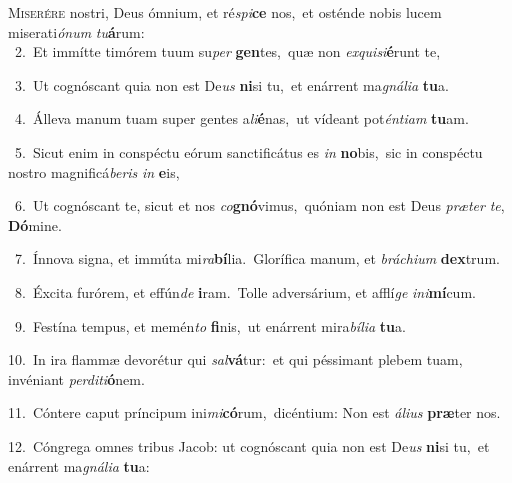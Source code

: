 \lettrine{\initial\textcolor{\initialcolor}{M}}{iserére} nostri, Deus ómnium, et ré\-\textit{spi}\-\textbf{ce} nos,~\star et osténde nobis lucem miserati\-\textit{ó}\-\textit{num} \textit{tu}\-\textbf{á}rum:\\
{\numbfont\textcolor{\numbcolor}{~2.}}~Et immítte timórem tuum su\textit{per} \textbf{gen}\-tes,~\star quæ non \textit{ex}\-\textit{qui}\textit{si}\textbf{é}runt te,\par
{\numbfont\textcolor{\numbcolor}{~3.}}~Ut cognóscant quia non est De\textit{us} \textbf{ni}\-si tu,~\star et enárrent ma\-\textit{gná}\-\textit{li}\textit{a} \textbf{tu}\-a.\par
{\numbfont\textcolor{\numbcolor}{~4.}}~Álleva manum tuam super gentes a\-\textit{li}\-\textbf{é}nas,~\star ut vídeant pot\-\textit{én}\-\textit{ti}\textit{am} \textbf{tu}\-am.\par
{\numbfont\textcolor{\numbcolor}{~5.}}~Sicut enim in conspéctu eórum sanctificátus es \textit{in} \textbf{no}\-bis,~\star sic in conspéctu nostro magnificá\-\textit{be}\-\textit{ris} \textit{in} \textbf{e}\-is,\par
{\numbfont\textcolor{\numbcolor}{~6.}}~Ut cognóscant te, sicut et nos \textit{co}\-\textbf{gnó}vimus,~\star quóniam non est Deus \textit{præ}\-\textit{ter} \textit{te}\-, \textbf{Dó}\-mine.\par
{\numbfont\textcolor{\numbcolor}{~7.}}~Ínnova signa, et immúta mi\-\textit{ra}\-\textbf{bí}lia.~\star Glorífica manum, et \textit{brá}\-\textit{chi}\textit{um} \textbf{dex}\-trum.\par
{\numbfont\textcolor{\numbcolor}{~8.}}~Éxcita furórem, et effún\textit{de} \textbf{i}\-ram.~\star Tolle adversárium, et afflí\textit{ge} \textit{in}\-\textit{i}\textbf{mí}cum.\par
{\numbfont\textcolor{\numbcolor}{~9.}}~Festína tempus, et memén\textit{to} \textbf{fi}\-nis,~\star ut enárrent mira\-\textit{bí}\-\textit{li}\textit{a} \textbf{tu}\-a.\par
{\numbfont\textcolor{\numbcolor}{10.}}~In ira flammæ devorétur qui \textit{sal}\-\textbf{vá}tur:~\star et qui péssimant plebem tuam, invéniant \textit{per}\-\textit{di}\textit{ti}\textbf{ó}nem.\par
{\numbfont\textcolor{\numbcolor}{11.}}~Cóntere caput príncipum ini\-\textit{mi}\-\textbf{có}rum,~\star dicéntium: Non est \textit{á}\-\textit{li}\textit{us} \textbf{præ}\-ter nos.\par
{\numbfont\textcolor{\numbcolor}{12.}}~Cóngrega omnes tribus Jacob: ut cognóscant quia non est De\textit{us} \textbf{ni}\-si tu,~\star et enárrent ma\-\textit{gná}\-\textit{li}\textit{a} \textbf{tu}\-a:\par
